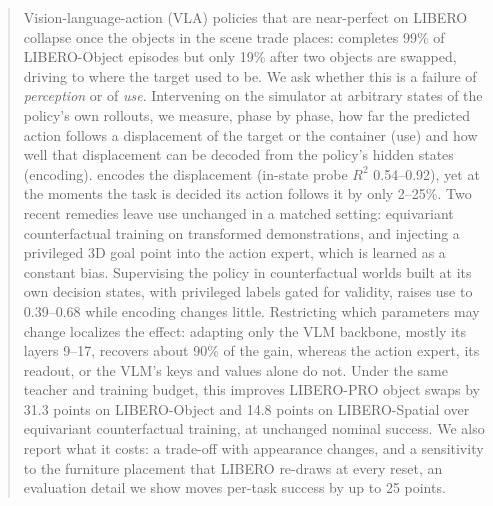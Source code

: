 \begin{abstract}
Vision-language-action (VLA) policies that are near-perfect on LIBERO collapse once the objects in the scene trade
places: \pizf completes 99\% of LIBERO-Object episodes but only 19\% after two objects are swapped, driving to where the
target used to be.
We ask whether this is a failure of \emph{perception} or of \emph{use}.
Intervening on the simulator at arbitrary states of the policy's own rollouts, we measure, phase by phase, how far the
predicted action follows a displacement of the target or the container (use) and how well that displacement can be
decoded from the policy's hidden states (encoding).
\pizf encodes the displacement (in-state probe $R^2$ 0.54--0.92), yet at the moments the task is decided its action
follows it by only 2--25\%.
Two recent remedies leave use unchanged in a matched setting: equivariant counterfactual training on transformed
demonstrations, and injecting a privileged 3D goal point into the action expert, which is learned as a constant bias.
Supervising the policy in counterfactual worlds built at its own decision states, with privileged labels gated for
validity, raises use to 0.39--0.68 while encoding changes little.
Restricting which parameters may change localizes the effect: adapting only the VLM backbone, mostly its layers 9--17,
recovers about 90\% of the gain, whereas the action expert, its readout, or the VLM's keys and values alone do not.
Under the same teacher and training budget, this improves LIBERO-PRO object swaps by 31.3 points on LIBERO-Object and
14.8 points on LIBERO-Spatial over equivariant counterfactual training, at unchanged nominal success.
We also report what it costs: a trade-off with appearance changes, and a sensitivity to the furniture placement that
LIBERO re-draws at every reset, an evaluation detail we show moves per-task success by up to 25 points.
\end{abstract}
